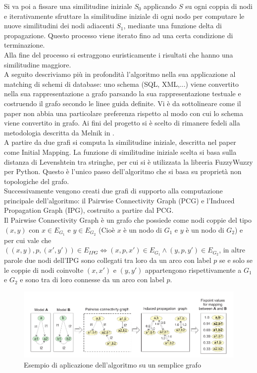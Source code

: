 \documentclass[a4paper,10pt]{article}
\begin{document}
Si va poi a fissare una similitudine iniziale $S_0$ applicando $S$ su ogni coppia di nodi e iterativamente sfruttare la similitudine iniziale di ogni nodo per computare le nuove similitudini dei nodi adiacenti $S_1$, mediante una funzione delta di propagazione. Questo processo viene iterato fino ad una certa condizione di terminazione.\\

Alla fine del processo si estraggono euristicamente i risultati che hanno una similitudine maggiore.\\

A seguito descriviamo più in profondità l’algoritmo nella sua applicazione al matching di schemi di database: uno schema (SQL, XML,...) viene convertito nella sua rappresentazione a grafo parsando la sua rappresentazione testuale e costruendo il grafo secondo le linee guida definite. Vi è da sottolineare come il paper non abbia una particolare preferenza rispetto al modo con cui lo schema viene convertito in grafo. Ai fini del progetto si è scelto di rimanere fedeli alla metodologia descritta da Melnik in \citep{generic_model_man}.\\

A partire da due grafi si computa la similitudine iniziale, descritta nel paper come Initial Mapping. La funzione di similitudine iniziale scelta si basa sulla distanza di Levenshtein tra stringhe, per cui si è utilizzata la libreria FuzzyWuzzy per Python. Questo è l’unico passo dell’algoritmo che si basa su proprietà non topologiche del grafo.\\

Successivamente vengono creati due grafi di supporto alla computazione principale dell’algoritmo: il Pairwise Connectivity Graph (PCG) e l’Induced Propagation Graph (IPG), costruito a partire dal PCG.\\

Il Pairwise Connectivity Graph è un grafo che possiede come nodi coppie del tipo $(x,y)$ con $x\in E_{G_1}$ e $y\in E_{G_2}$ (Cioè $x$ è un nodo di $G_1$ e $y$ è un nodo di $G_2$) e per cui vale che $((x,y), p, (x', y')) \in E_{IPG} \Leftrightarrow (x, p, x') \in E_{G_1} \wedge (y, p, y') \in E_{G_2}$, in altre parole due nodi dell'IPG sono collegati tra loro da un arco con label $p$ se e solo se le coppie di nodi coinvolte $(x, x')$ e $(y, y')$ appartengono rispettivamente a $G_1$ e $G_2$ e sono tra di loro connesse da un arco con label $p$.\\

\begin{figure}
\includegraphics[scale=0.4]{sf.png}
\caption{Esempio di aplicazione dell'algoritmo su un semplice grafo}
\label{sf1}
\end{figure}
\end{document}
